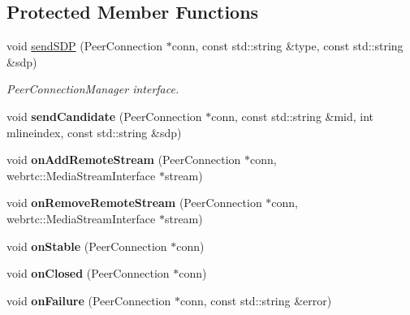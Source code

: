 \subsection*{Protected Member Functions}
\begin{DoxyCompactItemize}
\item 
\mbox{\label{classscy_1_1_signaler_a6372641d434cb42e5db3472f5f02fb51}} 
void \hyperlink{classscy_1_1_signaler_a6372641d434cb42e5db3472f5f02fb51}{send\+S\+DP} (Peer\+Connection $\ast$conn, const std\+::string \&type, const std\+::string \&sdp)
\begin{DoxyCompactList}\small\item\em Peer\+Connection\+Manager interface. \end{DoxyCompactList}\item 
\mbox{\label{classscy_1_1_signaler_a0b5d3bfd47e003e1803205adb40d9340}} 
void {\bfseries send\+Candidate} (Peer\+Connection $\ast$conn, const std\+::string \&mid, int mlineindex, const std\+::string \&sdp)
\item 
\mbox{\label{classscy_1_1_signaler_a73304df8397384383dec0a8fc816667a}} 
void {\bfseries on\+Add\+Remote\+Stream} (Peer\+Connection $\ast$conn, webrtc\+::\+Media\+Stream\+Interface $\ast$stream)
\item 
\mbox{\label{classscy_1_1_signaler_a7e02cb1ea085168dcd38376d4666ce64}} 
void {\bfseries on\+Remove\+Remote\+Stream} (Peer\+Connection $\ast$conn, webrtc\+::\+Media\+Stream\+Interface $\ast$stream)
\item 
\mbox{\label{classscy_1_1_signaler_a0332cb2f192fad69341ab4ced70e1de2}} 
void {\bfseries on\+Stable} (Peer\+Connection $\ast$conn)
\item 
\mbox{\label{classscy_1_1_signaler_ac999cfc5de5bc6fabbee0a46bb96e3aa}} 
void {\bfseries on\+Closed} (Peer\+Connection $\ast$conn)
\item 
\mbox{\label{classscy_1_1_signaler_a3ea6a613d14e1a8b73ab412d6050984e}} 
void {\bfseries on\+Failure} (Peer\+Connection $\ast$conn, const std\+::string \&error)
\item 

\end{DoxyCompactItemize}

